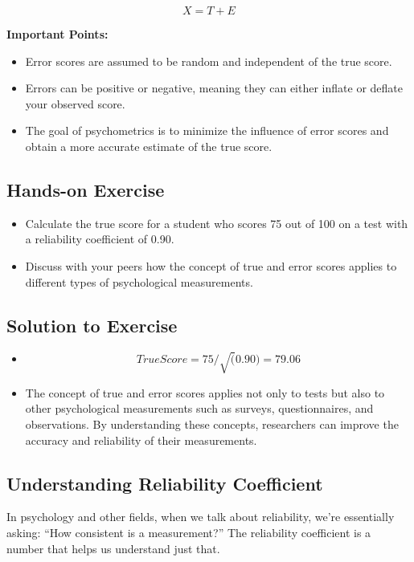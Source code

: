 \documentclass[12pt, a4paper]{exam}
\begin{document}
\[ X = T + E \]

\textbf{Important Points:}

\begin{itemize}
    \item Error scores are assumed to be random and independent of the true score.
    \item Errors can be positive or negative, meaning they can either inflate or deflate your observed score.
    \item The goal of psychometrics is to minimize the influence of error scores and obtain a more accurate estimate of the true score.
\end{itemize}

\subsection{Hands-on Exercise}

\begin{itemize}
    \item Calculate the true score for a student who scores 75 out of 100 on a test with a reliability coefficient of 0.90.
    \item Discuss with your peers how the concept of true and error scores applies to different types of psychological measurements.
\end{itemize}

\subsection{Solution to Exercise}

\begin{itemize}
    \item \[True Score = 75 / \sqrt(0.90) = 79.06 \]
    \item The concept of true and error scores applies not only to tests but also to other psychological measurements such as surveys, questionnaires, and observations. By understanding these concepts, researchers can improve the accuracy and reliability of their measurements.
\end{itemize}

\subsection{Understanding Reliability Coefficient}

In psychology and other fields, when we talk about reliability, we’re essentially asking: “How consistent is a measurement?” The reliability coefficient is a number that helps us understand just that.
\end{document}
